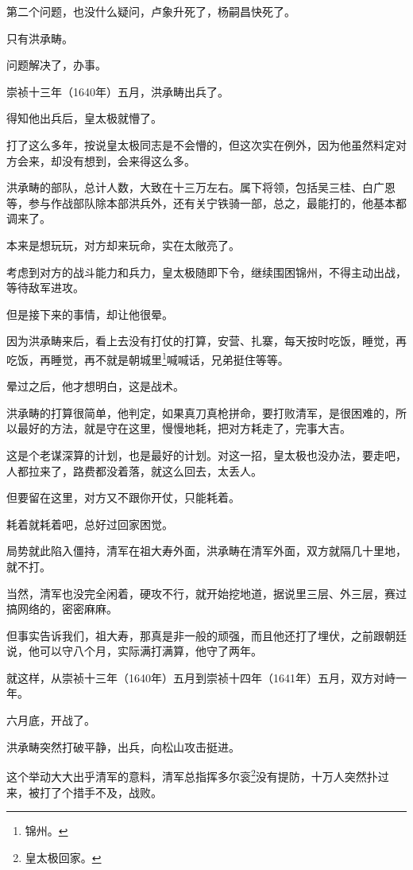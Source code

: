 \begin{multicols}{\theparacolNo}
		第二个问题，也没什么疑问，卢象升死了，杨嗣昌快死了。

		只有洪承畴。

		问题解决了，办事。

		崇祯十三年（1640年）五月，洪承畴出兵了。

		得知他出兵后，皇太极就懵了。

		打了这么多年，按说皇太极同志是不会懵的，但这次实在例外，因为他虽然料定对方会来，却没有想到，会来得这么多。

		洪承畴的部队，总计人数，大致在十三万左右。属下将领，包括吴三桂、白广恩等，参与作战部队除本部洪兵外，还有关宁铁骑一部，总之，最能打的，他基本都调来了。

		本来是想玩玩，对方却来玩命，实在太敞亮了。

		考虑到对方的战斗能力和兵力，皇太极随即下令，继续围困锦州，不得主动出战，等待敌军进攻。

		但是接下来的事情，却让他很晕。

		因为洪承畴来后，看上去没有打仗的打算，安营、扎寨，每天按时吃饭，睡觉，再吃饭，再睡觉，再不就是朝城里\footnote{锦州。}喊喊话，兄弟挺住等等。

		晕过之后，他才想明白，这是战术。

		洪承畴的打算很简单，他判定，如果真刀真枪拼命，要打败清军，是很困难的，所以最好的方法，就是守在这里，慢慢地耗，把对方耗走了，完事大吉。

		这是个老谋深算的计划，也是最好的计划。对这一招，皇太极也没办法，要走吧，人都拉来了，路费都没着落，就这么回去，太丢人。

		但要留在这里，对方又不跟你开仗，只能耗着。

		耗着就耗着吧，总好过回家困觉。

		局势就此陷入僵持，清军在祖大寿外面，洪承畴在清军外面，双方就隔几十里地，就不打。

		当然，清军也没完全闲着，硬攻不行，就开始挖地道，据说里三层、外三层，赛过搞网络的，密密麻麻。

		但事实告诉我们，祖大寿，那真是非一般的顽强，而且他还打了埋伏，之前跟朝廷说，他可以守八个月，实际满打满算，他守了两年。

		就这样，从崇祯十三年（1640年）五月到崇祯十四年（1641年）五月，双方对峙一年。

		六月底，开战了。

		洪承畴突然打破平静，出兵，向松山攻击挺进。

		这个举动大大出乎清军的意料，清军总指挥多尔衮\footnote{皇太极回家。}没有提防，十万人突然扑过来，被打了个措手不及，战败。


\end{multicols}
